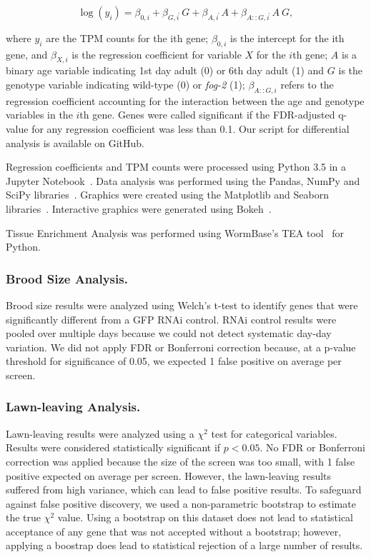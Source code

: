 \documentclass[9pt,twocolumn,twoside]{gsag3jnl}
\newcommand{\fog}{\emph{fog-2}}
\begin{document}
\begin{equation}
  \log(y_i) = \beta_{0,i} + \beta_{G,i}\dot~G + \beta_{A,i}\dot~A + \beta_{A::G,i}\dot~A~G,
  \label{eqn:GLM}
\end{equation}

where $y_i$ are the TPM counts for the ith gene; $\beta_{0,i}$ is the intercept for the ith gene, and $\beta_{X,i}$ is the regression coefficient for variable $X$ for the $i$th gene; $A$ is a binary age variable indicating 1st day adult (0) or 6th day adult (1) and $G$ is the genotype variable indicating wild-type (0) or \fog{} (1); $\beta_{A::G, i}$ refers to the regression coefficient accounting for the interaction between the age and genotype variables in the $i$th gene. Genes were called significant if the FDR-adjusted q-value for any regression coefficient was less than 0.1. Our script for differential analysis is available on GitHub.

Regression coefficients and TPM counts were processed using Python 3.5 in a Jupyter Notebook~\citep{Perez2007}. Data analysis was performed using the Pandas, NumPy and SciPy libraries~\citep{McKinney2011,VanDerWalt2011,Oliphant2007}. Graphics were created using the Matplotlib and Seaborn libraries~\citep{Waskom,Hunter2007}. Interactive graphics were generated using Bokeh~\citep{Team2014}.

Tissue Enrichment Analysis was performed using WormBase's TEA tool~\citep{Angeles-Albores2016} for Python.

\subsubsection{Brood Size Analysis.}

Brood size results were analyzed using Welch's t-test to identify genes that were significantly different from a GFP RNAi control. RNAi control results were pooled over multiple days because we could not detect systematic day-day variation. We did not apply FDR or Bonferroni correction because, at a p-value threshold for significance of 0.05, we expected 1 false positive on average per screen.

\subsubsection{Lawn-leaving Analysis.}

Lawn-leaving results were analyzed using a $\chi^2$ test for categorical variables. Results were considered statistically significant if $p<0.05$. No FDR or Bonferroni correction was applied because the size of the screen was too small, with 1 false positive expected on average per screen. However, the lawn-leaving results suffered from high variance, which can lead to false positive results.
To safeguard against false positive discovery, we used a non-parametric bootstrap to estimate the true $\chi^2$ value. Using a bootstrap on this dataset does not lead to statistical acceptance of any gene that was not accepted without a bootstrap; however, applying a boostrap does lead to statistical rejection of a large number of results.
\end{document}
